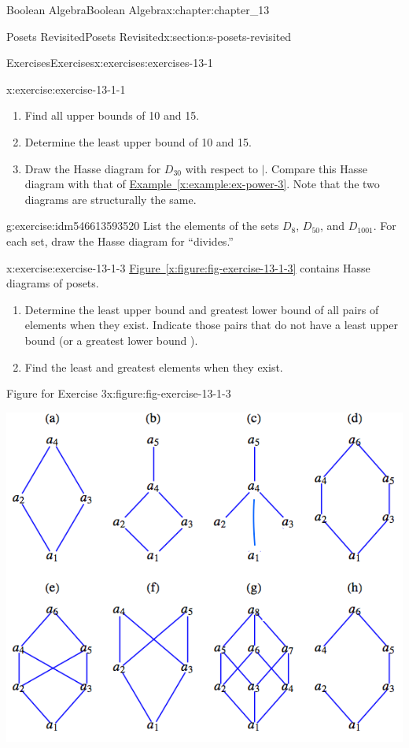 \documentclass[oneside,10pt,]{book}
\newcommand{\xreffont}{\relax}
\numberwithin{equation}{section}
\begin{document}
\begin{chapterptx}{Boolean Algebra}{}{Boolean Algebra}{}{}{x:chapter:chapter_13}
\begin{sectionptx}{Posets Revisited}{}{Posets Revisited}{}{}{x:section:s-posets-revisited}
\begin{exercises-subsection}{Exercises}{}{Exercises}{}{}{x:exercises:exercises-13-1}
\begin{divisionexercise}{1}{}{}{x:exercise:exercise-13-1-1}
\begin{enumerate}[label=(\alph*)]
\item{}Find all upper bounds of 10 and 15.%
\item{}Determine the least upper bound  of 10 and 15.%
\item{}Draw the Hasse diagram for \(D_{30}\) with respect to \(\mid\). Compare this Hasse diagram with that of \hyperref[x:example:ex-power-3]{Example~{\xreffont\ref{x:example:ex-power-3}}}. Note that the two diagrams are structurally the same.%
\end{enumerate}
%
\end{divisionexercise}%
\begin{divisionexercise}{2}{}{}{g:exercise:idm546613593520}%
List the elements of the sets \(D_8\), \(D_{50}\), and \(D_{1001}\). For each set, draw the Hasse diagram for ``divides.''%
\end{divisionexercise}%
\begin{divisionexercise}{3}{}{}{x:exercise:exercise-13-1-3}%
\hyperref[x:figure:fig-exercise-13-1-3]{Figure~{\xreffont\ref{x:figure:fig-exercise-13-1-3}}} contains Hasse diagrams of posets.%
\begin{enumerate}[label=(\alph*)]
\item{}Determine the least upper bound  and greatest lower bound  of all pairs of elements when they exist. Indicate those pairs that do not have a least upper bound  (or a greatest lower bound ).%
\item{}Find the least and greatest elements when they exist.%
\end{enumerate}
%
\begin{figureptx}{Figure for Exercise 3}{x:figure:fig-exercise-13-1-3}{}%
\begin{image}{0.1}{0.8}{0.1}%
\includegraphics[width=\linewidth]{images/fig-exercise-13-1-3.png}

\end{image}
\end{figureptx}
\end{divisionexercise}
\end{exercises-subsection}
\end{sectionptx}
\end{chapterptx}
\end{document}
